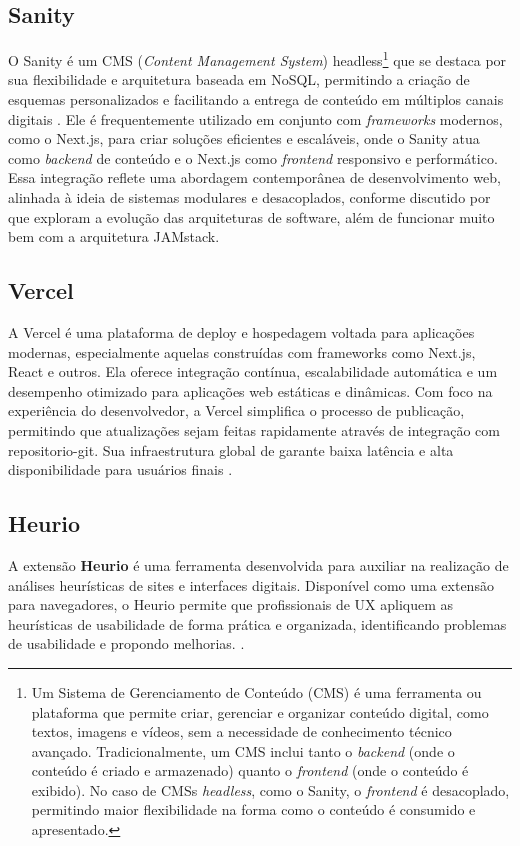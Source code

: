 \subsection{Sanity}
O Sanity é um CMS (\textit{Content Management System}) headless\footnote{ Um Sistema de Gerenciamento de Conteúdo (CMS) é uma ferramenta ou plataforma que permite criar, gerenciar e organizar conteúdo digital, como textos, imagens e vídeos, sem a necessidade de conhecimento técnico avançado. Tradicionalmente, um CMS inclui tanto o \textit{backend} (onde o conteúdo é criado e armazenado) quanto o \textit{frontend} (onde o conteúdo é exibido). No caso de CMSs \textit{headless}, como o Sanity, o \textit{frontend} é desacoplado, permitindo maior flexibilidade na forma como o conteúdo é consumido e apresentado.} que se destaca por sua flexibilidade e arquitetura baseada em NoSQL, permitindo a criação de esquemas personalizados e facilitando a entrega de conteúdo em múltiplos canais digitais \citep{sanity_official}. Ele é frequentemente utilizado em conjunto com \textit{frameworks} modernos, como o Next.js, para criar soluções eficientes e escaláveis, onde o Sanity atua como \textit{backend} de conteúdo e o Next.js como \textit{frontend} responsivo e performático. Essa integração reflete uma abordagem contemporânea de desenvolvimento web, alinhada à ideia de sistemas modulares e desacoplados, conforme discutido por \cite{gamma2000padrões} que exploram a evolução das arquiteturas de software, além de funcionar muito bem com a arquitetura JAMstack. 


\subsection{Vercel}
A Vercel é uma plataforma de \gls{deploy} e hospedagem voltada para aplicações modernas, especialmente aquelas construídas com \glspl{framework} como Next.js, React e outros. Ela oferece integração contínua, escalabilidade automática e um desempenho otimizado para aplicações web estáticas e dinâmicas. Com foco na experiência do desenvolvedor, a Vercel simplifica o processo de publicação, permitindo que atualizações sejam feitas rapidamente através de integração com \gls{repositorio-git}. Sua infraestrutura global de  garante baixa latência e alta disponibilidade para usuários finais \citep{vercel}.

\subsection{Heurio}
A extensão \textbf{Heurio} é uma ferramenta desenvolvida para auxiliar na realização de análises heurísticas de sites e interfaces digitais. Disponível como uma extensão para navegadores, o Heurio permite que profissionais de UX apliquem as heurísticas de usabilidade de forma prática e organizada, identificando problemas de usabilidade e propondo melhorias. \citep{Heurio}.

